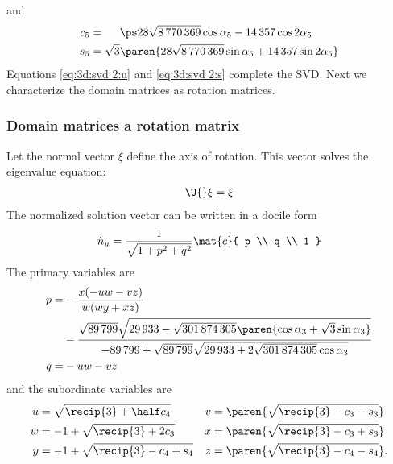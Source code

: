 and
%
\begin{equation}
  \begin{split}
    c_{5} &= \phantom{\sqrt{3}}\ps  28 \sqrt{8\,770\,369} \cos \alpha_{5} - 14\,357 \cos 2 \alpha_{5} \\
    s_{5} &= \sqrt{3} \paren{28 \sqrt{8\,770\,369} \sin \alpha_{5} + 14\,357 \sin 2 \alpha_{5}}
  \end{split}
\end{equation}
%
Equations \eqref{eq:3d:svd 2:u} and \eqref{eq:3d:svd 2:s} complete the SVD. Next we characterize the domain matrices as rotation matrices.


\subsubsection{Domain matrices a rotation matrix}
Let the normal vector $\xi$ define the axis of rotation. This vector solves the eigenvalue equation:
%
\begin{equation}
  \begin{split}
    \U{} \xi  &= \xi \\
  \end{split}
\end{equation}
%
The normalized solution vector can be written in a docile form
%
\begin{equation}
  \hat{n}_{u} = \frac{1}{\sqrt{ 1 + p^{2} + q^{2}}} \mat{c}{ p \\ q \\ 1 }
   \label{eq:fixed point II:u}
\end{equation}
The primary variables are
%
\begin{equation}
  \begin{split}
    p =
     &-\frac{x (-u w - v z)}{w (w y + x z)} \\
     &-\frac{\sqrt{89 \, 799} \sqrt{29\,933-\sqrt{301\,874\,305}\paren{ \cos \alpha_{3} + \sqrt{3} \sin \alpha_{3}} }}
           {-89 \, 799+\sqrt{89 \, 799} \sqrt{29\,933+2 \sqrt{301\,874\,305} \cos \alpha_{3}}} \\
    q = &- u w - v z
  \end{split}
\end{equation}
%
and the subordinate variables are
%
\begin{align} 
%
    u &=         \sqrt{ \recip{3} + \half c_{4}} &
    v &= \paren{ \sqrt{ \recip{3} - c_{3} - s_{3} } } \\
%
    w &=    -1 + \sqrt{ \recip{3} + 2 c_{3}} &
    x &= \paren{ \sqrt{ \recip{3} - c_{3} + s_{3} } } \\
%
    y &=    -1 + \sqrt{ \recip{3} - c_{4} + s_{4} } &
    z &= \paren{ \sqrt{ \recip{3} - c_{4} - s_{4} } } .
% 
\end{align}
